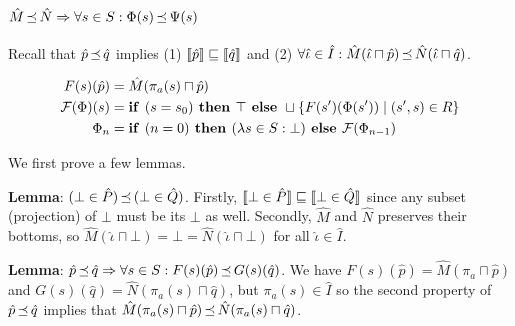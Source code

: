\subsection{$\hat M \operatorname{\mathrel{\preceq}} \hat N \Rightarrow \forall s \in S : \Phi(s) \operatorname{\mathrel{\preceq}} \Psi(s)$}

Recall that $\hat p \operatorname{\mathrel{\preceq}} \hat q$ implies (1) $\llbracket\hat p\rrbracket \sqsubseteq \llbracket\hat q\rrbracket$ and (2) $\forall \hat \iota \in \hat I : \hat M(\hat \iota \sqcap \hat p) \operatorname{\mathrel{\preceq}} \hat N(\hat \iota \sqcap \hat q)$.

\begin{align*}
F(s)(\hat p) &= \hat M(\pi_{a}(s) \sqcap \hat p) \\
\mathcal{F}(\Phi)(s) &= \textrm{\textbf{if }} (s = s_{0}) \textrm{\textbf{ then }} \top \textrm{\textbf{ else }} \sqcup \{ F(s')(\Phi(s')) \mid (s',s) \in R \} \\
\Phi_{n} &= \textrm{\textbf{if }} (n = 0) \textrm{\textbf{ then }} (\lambda s \in S : \bot) \textrm{\textbf{ else }} \mathcal{F}(\Phi_{n-1})
\end{align*}

We first prove a few lemmas.

\textbf{Lemma}: $(\bot \in \hat P) \operatorname{\mathrel{\preceq}} \, (\bot \in \hat Q)$. Firstly, $\llbracket\bot \in \hat P\rrbracket \sqsubseteq \llbracket\bot \in \hat Q\rrbracket$ since any subset (projection) of $\bot$ must be its $\bot$ as well. Secondly, $\hat M$ and $\hat N$ preserves their bottoms, so $\hat M(\hat \iota \sqcap \bot) = \bot = \hat N(\hat \iota \sqcap \bot)$ for all $\hat \iota \in \hat I$.

\textbf{Lemma}: $\hat p \operatorname{\mathrel{\preceq}} \hat q \Rightarrow \forall s \in S : F(s)(\hat p) \operatorname{\mathrel{\preceq}} G(s)(\hat q)$. We have $F(s)(\hat p) = \hat M(\pi_{a} \sqcap \hat p)$ and $G(s)(\hat q) = \hat N(\pi_{a}(s) \sqcap \hat q)$, but $\pi_{a}(s) \in \hat I$ so the second property of $\hat p \operatorname{\mathrel{\preceq}} \hat q$ implies that $\hat M(\pi_{a}(s) \sqcap \hat p) \operatorname{\mathrel{\preceq}} \hat N(\pi_{a}(s) \sqcap \hat q)$.




